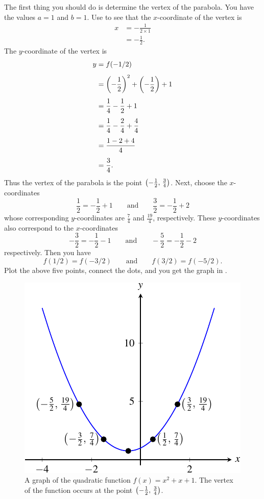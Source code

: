\documentclass[a4paper,oneside,12pt]{article}
\begin{document}
\begin{solution}
The first thing you should do is determine the vertex of the parabola.
You have the values $a = 1$ and $b = 1$.  Use
 to see that the
$x$-coordinate of the vertex is
\begin{align*}
x
&=
-\frac{1}{2 \times 1} \\[4pt]
&=
-\frac{1}{2}.
\end{align*}
The $y$-coordinate of the vertex is
\begin{align*}
y
&=
f(-1/2) \\[4pt]
&=
\parenthesis*{-\frac{1}{2}}^2 + \parenthesis*{-\frac{1}{2}} + 1 \\[4pt]
&=
\frac{1}{4} - \frac{1}{2} + 1 \\[4pt]
&=
\frac{1}{4} - \frac{2}{4} + \frac{4}{4} \\[4pt]
&=
\frac{1 - 2 + 4}{4} \\[4pt]
&=
\frac{3}{4}.
\end{align*}
Thus the vertex of the parabola is the point
$\tuple{-\frac{1}{2}}{\frac{3}{4}}$.  Next, choose the $x$-coordinates
\begin{equation}
\label{eqn:a1_b1_c1_x_coordinates}
\frac{1}{2} = -\frac{1}{2} + 1
\qquad
\text{and}
\qquad
\frac{3}{2} = -\frac{1}{2} + 2
\end{equation}
whose corresponding $y$-coordinates are $\frac{7}{4}$ and
$\frac{19}{4}$, respectively.  These $y$-coordinates also correspond
to the $x$-coordinates
\[
-\frac{3}{2}
=
-\frac{1}{2} - 1
\qquad
\text{and}
\qquad
-\frac{5}{2}
=
-\frac{1}{2} - 2
\]
respectively.  Then you have
\[
f(1/2) = f(-3/2)
\qquad
\text{and}
\qquad
f(3/2) = f(-5/2).
\]
Plot the above five points, connect the dots, and you get the graph
in .
\end{solution}

\begin{figure}[!htbp]
\centering
\includegraphics[scale=1.2]{image/08/a1-b1-c1.pdf}
\caption{%
  A graph of the quadratic function $f(x) = x^2 + x + 1$.  The vertex
  of the function occurs at the point
  $\tuple{-\frac{1}{2}}{\frac{3}{4}}$.
}
\label{fig:quadratic_graph_a1_b1_c1}
\end{figure}
\end{document}
